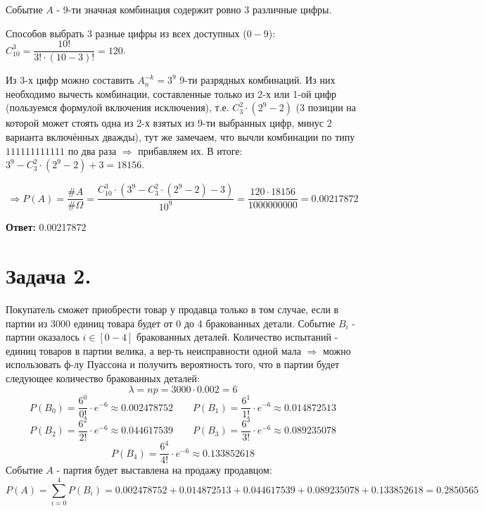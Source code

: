 Событие $A$ - 9-ти значная комбинация содержит ровно 3 различные цифры.

Способов выбрать 3 разные цифры из всех доступных ($0-9$): $C_{10}^3 = \dfrac{10!}{3! \cdot (10-3)!} = 120$. 

Из 3-х цифр можно составить $A_n^{-k} = 3^9$ 9-ти разрядных комбинаций. Из них необходимо вычесть комбинации, составленные только из 2-х или 1-ой цифр (пользуемся формулой включения исключения), т.е. $C_3^2 \cdot (2^9 - 2)$ (3 позиции на которой может стоять одна из 2-х взятых из 9-ти выбранных цифр, минус 2 варианта включённых дважды), тут же замечаем, что вычли комбинации по типу $111111111111$ по два раза $\Rightarrow$ прибавляем их. В итоге: $3^9 - C_3^2 \cdot (2^9 - 2) + 3 = 18156$.

\[ \Rightarrow P(A) = \frac{\# A}{\# \Omega} = \frac{C_{10}^3 \cdot (3^9 - C_3^2 \cdot (2^9 - 2) - 3)}{10^9} = \frac{120 \cdot 18156}{1000000000} = 0.00217872 \]

\noindent \textbf{Ответ:} 0.00217872

\section*{Задача 2.}

\begin{center}
	\qquad
\end{center}

Покупатель сможет приобрести товар у продавца только в том случае, если в партии из 3000 единиц товара будет от 0 до 4 бракованных детали. Событие $B_i$ - партии оказалось $i \in [0-4]$ бракованных деталей. Количество испытаний - единиц товаров в партии велика, а вер-ть неисправности одной мала $\Rightarrow$ можно использовать ф-лу Пуассона и получить вероятность того, что в партии будет следующее количество бракованных деталей:
\[ \lambda = np = 3000 \cdot 0.002 = 6 \]
\[ P(B_0) = \frac{6^0}{0!} \cdot e^{-6} \approx 0.002478752 ~~~~~~~~~ P(B_1) = \frac{6^1}{1!} \cdot e^{-6} \approx 0.014872513 \]
\[ P(B_2) = \frac{6^2}{2!} \cdot e^{-6} \approx 0.044617539 ~~~~~~~~~ P(B_3) = \frac{6^3}{3!} \cdot e^{-6} \approx 0.089235078 \]
\[ P(B_4) = \frac{6^4}{4!} \cdot e^{-6} \approx 0.133852618 \]
Событие $A$ - партия будет выставлена на продажу продавцом:
\[ P(A) = \sum_{i=0}^{4} P(B_i) = 0.002478752 + 0.014872513 + 0.044617539 + 0.089235078 + 0.133852618 = 0.2850565 \]

